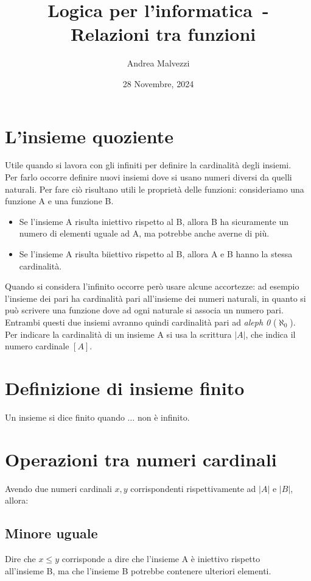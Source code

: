\documentclass[12pt]{article}
\author{Andrea Malvezzi}
\title{\textbf{Logica per l'informatica~-~Relazioni tra funzioni}}
\date{28 Novembre, 2024}
\begin{document}
\maketitle
\pagebreak
\tableofcontents
\pagebreak

\section{L'insieme quoziente}
Utile quando si lavora con gli infiniti per definire la cardinalità degli insiemi.
\\
Per farlo occorre definire nuovi insiemi dove si usano numeri diversi da quelli naturali.
Per fare ciò risultano utili le proprietà delle funzioni: consideriamo una funzione A e una funzione B.
\begin{itemize}
    \item Se l'insieme A risulta iniettivo rispetto al B, allora B ha sicuramente un numero di elementi uguale ad A, ma potrebbe anche averne di più.
    \item Se l'insieme A risulta biiettivo rispetto al B, allora A e B hanno la stessa cardinalità.
\end{itemize}
Quando si considera l'infinito occorre però usare alcune accortezze:
ad esempio l'insieme dei pari ha cardinalità pari all'insieme dei numeri naturali, in quanto si può scrivere una funzione dove ad ogni naturale si associa un numero pari.
Entrambi questi due insiemi avranno quindi cardinalità pari ad \textit{aleph 0} ($\aleph_0$).
\\
Per indicare la cardinalità di un insieme A si usa la scrittura $|A|$, che indica il numero cardinale $[A]$.

\section{Definizione di insieme finito}
Un insieme si dice finito quando $\dots$ non è infinito.

\section{Operazioni tra numeri cardinali}
Avendo due numeri cardinali $x, y$ corrispondenti rispettivamente ad $|A|$ e $|B|$, allora:

\subsection{Minore uguale}
Dire che $x \leq y$ corrisponde a dire che l'insieme A è iniettivo rispetto \\
all'insieme B, ma che l'insieme B potrebbe contenere ulteriori elementi.
\end{document}
